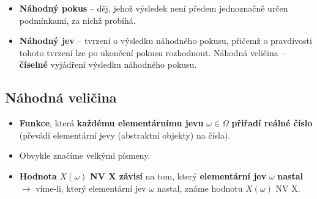 \begin{itemize}
\item \textbf{Náhodný pokus} -- děj, jehož výsledek není předem jednoznačně určen podmínkami, za nichž probíhá.
\item \textbf{Náhodný jev} -- tvrzení o výsledku náhodného pokusu, přičemž o pravdivosti tohoto tvrzení lze po ukončení pokusu rozhodnout.
Náhodná veličina  -- \textbf{číselné} vyjádření výsledku náhodného pokusu.
\end{itemize}

\subsection{Náhodná veličina}
\begin{itemize}
	\item \textbf{Funkce}, která \textbf{každému elementárnímu jevu} $\omega \in \Omega$ \textbf{přiřadí reálné číslo} (převádí elementární jevy (abstraktní objekty) na čísla).
	\item Obvykle značíme velkými písmeny.
	\item \textbf{Hodnota} $X(\omega)$ \textbf{NV X závisí} na tom, který \textbf{elementární jev} $\omega$ \textbf{nastal} $\rightarrow$ víme-li, který elementární jev $\omega$ nastal, známe hodnotu $X(\omega)$ NV X.
\end{itemize}
